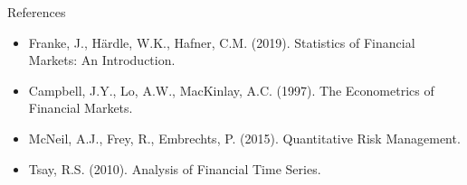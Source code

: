 \documentclass[9pt, aspectratio=169, t]{beamer}
\theoremstyle{definition}
\begin{document}
\begin{frame}{References}
    \begin{itemize}
        \item Franke, J., H\"ardle, W.K., Hafner, C.M. (2019). Statistics of Financial Markets: An Introduction.
        \item Campbell, J.Y., Lo, A.W., MacKinlay, A.C. (1997). The Econometrics of Financial Markets.
        \item McNeil, A.J., Frey, R., Embrechts, P. (2015). Quantitative Risk Management.
        \item Tsay, R.S. (2010). Analysis of Financial Time Series.
    \end{itemize}
\end{frame}
\end{document}
